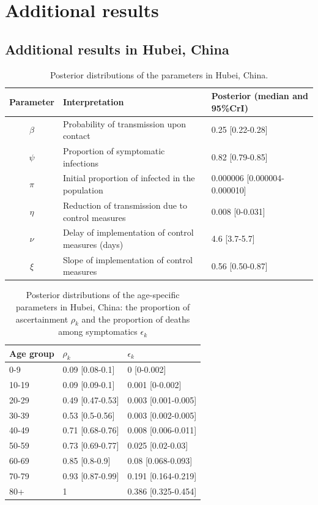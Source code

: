 \documentclass{article}
\begin{document}
\clearpage	
\section{Additional results}
\label{addres}

\subsection{Additional results in Hubei, China}

\begin{table}[H]
	\caption{Posterior distributions of the parameters in Hubei, China.}
	\centering
	\begin{tabular}{cll}
		\hline
		Parameter& Interpretation & Posterior (median and 95\%CrI) \\ 
		\hline
		$\beta$ & Probability of transmission upon contact & 0.25 [0.22-0.28] \\ 
		$\psi$ & Proportion of symptomatic infections &0.82 [0.79-0.85] \\ 
		$\pi$ & Initial proportion of infected in the population & 0.000006 [0.000004- 0.000010] \\ 
		$\eta$ & Reduction of transmission due to control measures &0.008 [0-0.031] \\ 
		$\nu$ & Delay of implementation of control measures (days) &4.6 [3.7-5.7] \\ 
		$\xi$ & Slope of implementation of control measures & 0.56 [0.50-0.87] \\ 
		\hline
	\end{tabular}
\end{table}

\begin{table}[H]
	\caption{Posterior distributions of the age-specific parameters in Hubei, China: the proportion of ascertainment $\rho_k$ and the proportion of deaths among symptomatics $\epsilon_k$}
	\centering
	\begin{tabular}{lll}
		\hline
		Age group & $\rho_k$ & $\epsilon_k$ \\ 
		\hline
		0-9 & 0.09 [0.08-0.1] & 0 [0-0.002] \\ 
		10-19 & 0.09 [0.09-0.1] & 0.001 [0-0.002] \\ 
		20-29 & 0.49 [0.47-0.53] & 0.003 [0.001-0.005] \\ 
		30-39 & 0.53 [0.5-0.56] & 0.003 [0.002-0.005] \\ 
		40-49 & 0.71 [0.68-0.76] & 0.008 [0.006-0.011] \\ 
		50-59 & 0.73 [0.69-0.77] & 0.025 [0.02-0.03] \\ 
		60-69 & 0.85 [0.8-0.9] & 0.08 [0.068-0.093] \\ 
		70-79 & 0.93 [0.87-0.99] & 0.191 [0.164-0.219] \\ 
		80+ & 1 & 0.386 [0.325-0.454] \\ 
		\hline
	\end{tabular}
\end{table}
\end{document}
